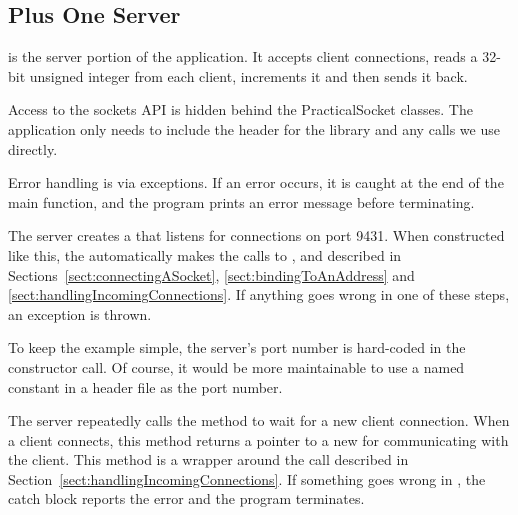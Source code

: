 \subsection{Plus One Server}

 is the server portion of the application.  It
accepts client connections, reads a 32-bit unsigned integer from each
client, increments it and then sends it back.


\begin{topcode}



Access to the sockets API is hidden behind the PracticalSocket
classes.  The application only needs to include the header for the
library and any calls we use directly.



Error handling is via exceptions.  If an error occurs, it is caught at
the end of the main function, and the program prints an error message
before terminating.


The server creates a  that listens for
connections on port 9431.  When constructed like this, the
 automatically makes the calls to
,  and  described in
Sections~\ref{sect:connectingASocket}, \ref{sect:bindingToAnAddress}
and \ref{sect:handlingIncomingConnections}.  If anything goes wrong in
one of these steps, an exception is thrown.

To keep the example simple, the server's port number is hard-coded in
the constructor call.  Of course, it would be more maintainable to use
a named constant in a header file as the port number.


The server repeatedly calls the  method to wait for a
new client connection.  When a client connects, this method returns a
pointer to a new  for communicating with the client.
This method is a wrapper around the  call described
in Section~\ref{sect:handlingIncomingConnections}.  If something goes
wrong in , the catch block reports the error and the
program terminates.



\end{topcode}
